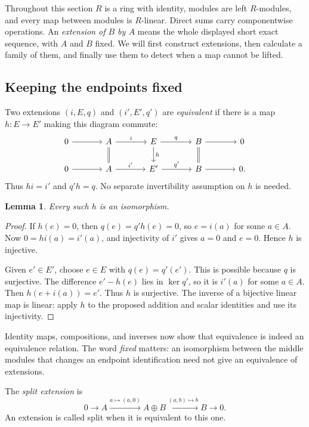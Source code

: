 \documentclass[11pt]{article}
\newtheorem{lemma}[theorem]{Lemma}
\theoremstyle{definition}
\theoremstyle{remark}\newtheorem{remark}[theorem]{Remark}
\DeclareMathOperator{\Ker}{ker}
\begin{document}
Throughout this section $R$ is a ring with identity, modules are left
$R$-modules, and every map between modules is $R$-linear. Direct sums carry
componentwise operations. An \emph{extension of $B$ by $A$} means the whole
displayed short exact sequence, with $A$ and $B$ fixed. We will first
construct extensions, then calculate a family of them, and finally use
them to detect when a map cannot be lifted.

\subsection{Keeping the endpoints fixed}

Two extensions $(i,E,q)$ and $(i',E',q')$ are \emph{equivalent} if there is
a map $h:E\to E'$ making this diagram commute:
\[
\begin{tikzcd}[column sep=large]
0\arrow[r]&A\arrow[r,"i"]\arrow[d,equal]
 &E\arrow[r,"q"]\arrow[d,"h"]&B\arrow[r]\arrow[d,equal]&0\\
0\arrow[r]&A\arrow[r,"i'"]&E'\arrow[r,"q'"]&B\arrow[r]&0.
\end{tikzcd}
\]
Thus $hi=i'$ and $q'h=q$. No separate invertibility assumption on $h$ is
needed.

\begin{lemma}\label{x:marked-iso}
Every such $h$ is an isomorphism.
\end{lemma}
\begin{proof}
If $h(e)=0$, then $q(e)=q'h(e)=0$, so $e=i(a)$ for some $a\in A$.
Now $0=hi(a)=i'(a)$, and injectivity of $i'$ gives $a=0$ and $e=0$.
Hence $h$ is injective.

Given $e'\in E'$, choose $e\in E$ with $q(e)=q'(e')$. This is possible
because $q$ is surjective. The difference $e'-h(e)$ lies in $\Ker q'$, so
it is $i'(a)$ for some $a\in A$. Then $h(e+i(a))=e'$. Thus $h$ is
surjective. The inverse of a bijective linear map is linear: apply $h$ to
the proposed addition and scalar identities and use its injectivity.
\end{proof}

Identity maps, compositions, and inverses now show that equivalence is
indeed an equivalence relation. The word \emph{fixed} matters: an
isomorphism between the middle modules that changes an endpoint
identification need not give an equivalence of extensions.

The \emph{split extension} is
\[
0\longrightarrow A\xrightarrow{a\mapsto(a,0)}A\oplus B
 \xrightarrow{(a,b)\mapsto b}B\longrightarrow0.
\]
An extension is called split when it is equivalent to this one.
\end{document}
